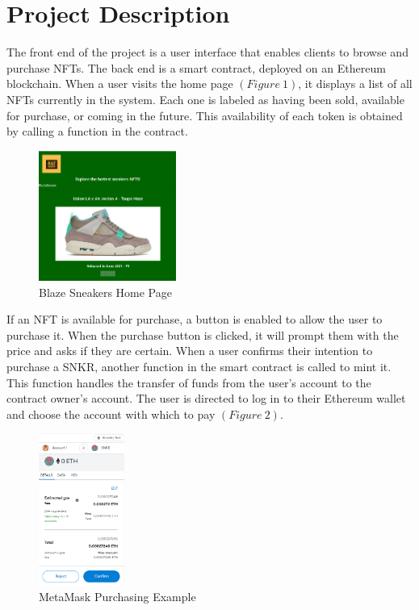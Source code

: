 \documentclass{article}
\begin{document}
\section{Project Description}
    The front end of the project is a user interface that enables clients to browse and purchase NFTs.
    The back end is a smart contract, deployed on an Ethereum blockchain.
    When a user visits the home page $( Figure~1 )$, it displays a list of all NFTs currently in the system. 
    Each one is labeled as having been sold, available for purchase, or coming in the future.
    This availability of each token is obtained by calling a function in the contract.
    
\begin{figure}[!h]
    \centering
    \includegraphics[width=0.4\textwidth]{HomePage.png}
    \caption{Blaze Sneakers Home Page}
\end{figure}
    
    If an NFT is available for purchase, a button is enabled to allow the user to purchase it.
    When the purchase button is clicked, it will prompt them with the price and asks if they are certain.
    When a user confirms their intention to purchase a SNKR, another function in the smart contract is called to mint it.
    This function handles the transfer of funds from the user's account to the contract owner's account.
    The user is directed to log in to their Ethereum wallet and choose the account with which to pay $( Figure~2 )$.
    
\begin{figure}[!h]
    \centering
    \includegraphics[width=0.25\textwidth]{MetaMaskPurchasing.png}
    \caption{MetaMask Purchasing Example}
\end{figure}
\end{document}
